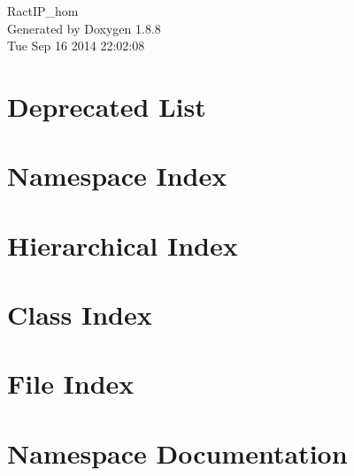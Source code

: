 \documentclass[twoside]{book}
\newcommand{\+}{\discretionary{\mbox{\scriptsize$\hookleftarrow$}}{}{}}
\newcommand{\clearemptydoublepage}{%
  \newpage{\pagestyle{empty}\cleardoublepage}%
}
\begin{document}
\hypersetup{pageanchor=false,
             bookmarks=true,
             bookmarksnumbered=true,
             pdfencoding=unicode
            }
\begin{titlepage}
\vspace*{7cm}
\begin{center}%
{\Large Ract\+I\+P\+\_\+hom }\\
\vspace*{1cm}
{\large Generated by Doxygen 1.8.8}\\
\vspace*{0.5cm}
{\small Tue Sep 16 2014 22:02:08}\\
\end{center}
\end{titlepage}
\clearemptydoublepage
\tableofcontents
\clearemptydoublepage
{}
\hypersetup{pageanchor=true}

\chapter{Deprecated List}
\label{deprecated}
\hypertarget{deprecated}{}

\chapter{Namespace Index}

\chapter{Hierarchical Index}

\chapter{Class Index}

\chapter{File Index}

\chapter{Namespace Documentation}








\end{document}
